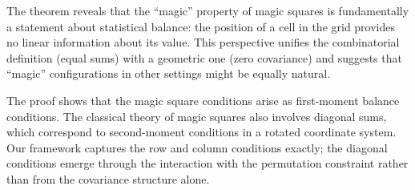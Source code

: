 \begin{remark}
The theorem reveals that the ``magic'' property of magic squares is fundamentally a statement about statistical balance: the position of a cell in the grid provides no linear information about its value. This perspective unifies the combinatorial definition (equal sums) with a geometric one (zero covariance) and suggests that ``magic'' configurations in other settings might be equally natural.
\end{remark}

\begin{remark}
The proof shows that the magic square conditions arise as first-moment balance conditions. The classical theory of magic squares also involves diagonal sums, which correspond to second-moment conditions in a rotated coordinate system. Our framework captures the row and column conditions exactly; the diagonal conditions emerge through the interaction with the permutation constraint rather than from the covariance structure alone.
\end{remark}


